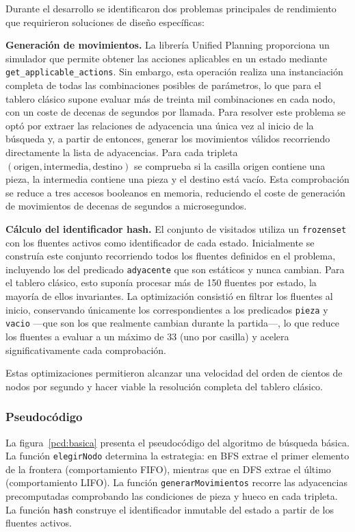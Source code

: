 \documentclass[conference,a4paper]{IEEEtran}
\begin{document}
Durante el desarrollo se identificaron dos problemas principales de rendimiento
que requirieron soluciones de diseño específicas:

\textbf{Generación de movimientos.} La librería Unified Planning proporciona
un simulador que permite obtener las acciones aplicables en un estado mediante
\texttt{get\_applicable\_actions}. Sin embargo, esta operación realiza una
instanciación completa de todas las combinaciones posibles de parámetros, lo
que para el tablero clásico supone evaluar más de treinta mil combinaciones en
cada nodo, con un coste de decenas de segundos por llamada. Para resolver este
problema se optó por extraer las relaciones de adyacencia una única vez al
inicio de la búsqueda y, a partir de entonces, generar los movimientos válidos
recorriendo directamente la lista de adyacencias. Para cada tripleta
$(\text{origen}, \text{intermedia}, \text{destino})$ se comprueba si la
casilla origen contiene una pieza, la intermedia contiene una pieza y el
destino está vacío. Esta comprobación se reduce a tres accesos booleanos en
memoria, reduciendo el coste de generación de movimientos de decenas de
segundos a microsegundos.

\textbf{Cálculo del identificador hash.} El conjunto de visitados utiliza
un \texttt{frozenset} con los fluentes activos como identificador de cada
estado. Inicialmente se construía este conjunto recorriendo todos los fluentes
definidos en el problema, incluyendo los del predicado \texttt{adyacente} que
son estáticos y nunca cambian. Para el tablero clásico, esto suponía procesar
más de 150 fluentes por estado, la mayoría de ellos invariantes. La
optimización consistió en filtrar los fluentes al inicio, conservando
únicamente los correspondientes a los predicados \texttt{pieza} y
\texttt{vacio} —que son los que realmente cambian durante la partida—, lo que
reduce los fluentes a evaluar a un máximo de 33 (uno por casilla) y acelera
significativamente cada comprobación.

Estas optimizaciones permitieron alcanzar una velocidad del orden de cientos
de nodos por segundo y hacer viable la resolución completa del tablero
clásico.

\subsubsection{Pseudocódigo}

La figura~\ref{pcd:basica} presenta el pseudocódigo del algoritmo de búsqueda
básica. La función \texttt{elegirNodo} determina la estrategia: en BFS extrae
el primer elemento de la frontera (comportamiento FIFO), mientras que en DFS
extrae el último (comportamiento LIFO). La función \texttt{generarMovimientos}
recorre las adyacencias precomputadas comprobando las condiciones de pieza y
hueco en cada tripleta. La función \texttt{hash} construye el identificador
inmutable del estado a partir de los fluentes activos.
\end{document}
